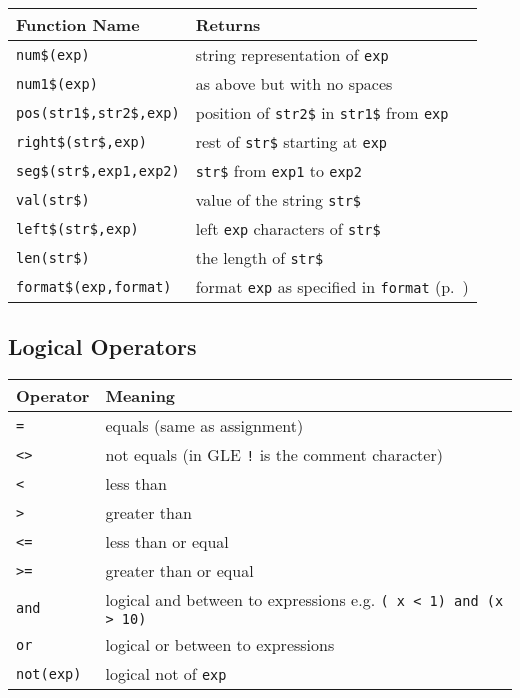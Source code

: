 \begin{supertabular}{ll} \hline
Function Name     & Returns  \\ \hline
{\tt num\$(exp)}      	& string representation of {\tt exp} \\
{\tt num1\$(exp)}    	& as above but with no spaces \\
{\tt pos(str1\$,str2\$,exp)}      & position of {\tt str2\$} in {\tt str1\$} from {\tt exp} \\
{\tt right\$(str\$,exp)}      & rest of {\tt str\$} starting at {\tt exp} \\
{\tt seg\$(str\$,exp1,exp2)}    & {\tt str\$} from {\tt exp1} to {\tt exp2} \\
{\tt val(str\$)}        	& value of the string {\tt str\$} \\
{\tt left\$(str\$,exp)}   & left {\tt exp} characters of {\tt str\$} \\
{\tt len(str\$)}        	& the length of {\tt str\$} \\
{\tt format\$(exp,format)}  & format {\tt exp} as specified in {\tt format} (p.~\pageref{formatnum:pg})\\
\end{supertabular}

\subsection{Logical Operators}


\begin{tabular}{ll} \hline
Operator & Meaning  \\ \hline
{\tt =} \index{=}      & equals (same as assignment) \\
{\tt \textless \textgreater} \index{\textless \textgreater}  & not equals (in GLE {\tt !} is the comment character)  \\
{\tt \textless } \index{\textless} & less than\\
{\tt \textgreater } \index{\textgreater}  & greater than\\
{\tt \textless =} \index{\textless =}  & less than or equal \\
{\tt \textgreater =} \index{\textgreater =}  & greater than or equal \\
{\tt and} \index{and}     & logical and between to expressions e.g. {\tt ( x \textless\ 1) and  (x \textgreater\ 10) }\\
{\tt or} \index{or}     & logical or between to expressions\\
{\tt not(exp)} \index{not()}   & logical not of {\tt exp} \\
\end{tabular}

